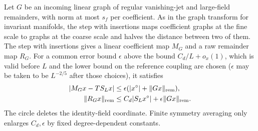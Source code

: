 Let $G$ be an incoming linear graph of regular vanishing-jet and
large-field remainders, with norm at most $s_f$ per coefficient. As in the graph transform for invariant manifolds, the step with insertions maps coefficient graphs at the fine scale to graphs at the coarse scale and halves the distance between two of them.
The step with insertions gives a linear coefficient map $M_G$ and a
raw remainder map $R_G$. For a common error bound $\epsilon$ above the bound $C_d/L+o_x(1)$, which is valid before $L$ and the lower bound on the reference coupling are chosen ($\epsilon$ may be taken to be $L^{-2/5}$ after those choices), it satisfies
\begin{align}
 |M_Gx-TS_Lx|&\le\epsilon(|x^\circ|+\|Gx\|_{\rm rem}),\notag\\
 \|R_Gx\|_{\rm rem}&\le C_d|S_Lx^\circ|
                                  +\epsilon\|Gx\|_{\rm rem}.
 \label{ch11:graph-estimates}
\end{align}
The circle deletes the identity-field coordinate. Finite symmetry averaging
only enlarges $C_d,\epsilon$ by fixed degree-dependent constants.

